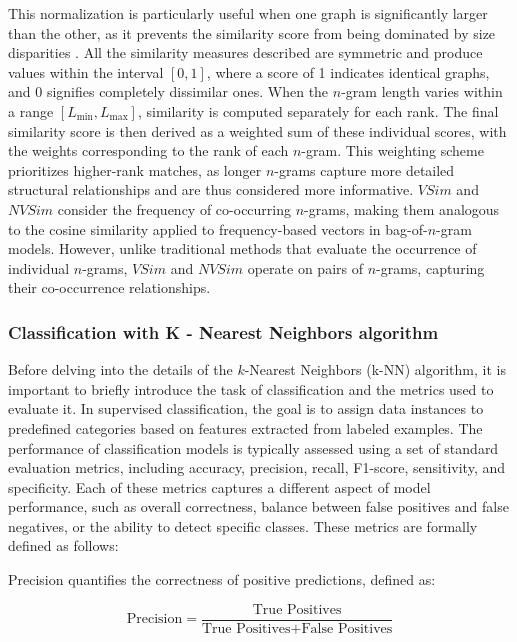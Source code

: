 \documentclass{article}
\begin{document}
This normalization is particularly useful when one graph is significantly larger than the other, as it prevents the similarity score from being dominated by size disparities \cite{giannakopoulos2008, papadakis2016}. All the similarity measures described are symmetric and produce values within the interval \([0, 1]\), where a score of 1 indicates identical graphs, and 0 signifies completely dissimilar ones. When the \( n \)-gram length varies within a range \([L_{\min}, L_{\max}]\), similarity is computed separately for each rank. The final similarity score is then derived as a weighted sum of these individual scores, with the weights corresponding to the rank of each \( n \)-gram. This weighting scheme prioritizes higher-rank matches, as longer \( n \)-grams capture more detailed structural relationships and are thus considered more informative. \( VSim \) and \( NVSim \) consider the frequency of co-occurring \( n \)-grams, making them analogous to the cosine similarity applied to frequency-based vectors in bag-of-\( n \)-gram models. However, unlike traditional methods that evaluate the occurrence of individual \( n \)-grams, \( VSim \) and \( NVSim \) operate on pairs of \( n \)-grams, capturing their co-occurrence relationships.

\subsubsection{Classification with K - Nearest Neighbors algorithm} \label{sec:classification}

Before delving into the details of the $k$-Nearest Neighbors (k-NN) algorithm, it is important to briefly introduce the task of classification and the metrics used to evaluate it. In supervised classification, the goal is to assign data instances to predefined categories based on features extracted from labeled examples. The performance of classification models is typically assessed using a set of standard evaluation metrics, including accuracy, precision, recall, F1-score, sensitivity, and specificity. Each of these metrics captures a different aspect of model performance, such as overall correctness, balance between false positives and false negatives, or the ability to detect specific classes. These metrics \cite{sokolova2009} are formally defined as follows:

Precision quantifies the correctness of positive predictions, defined as:

\[
\text{Precision} = \frac{\text{True Positives}}{\text{True Positives} + \text{False Positives}}
\]
\end{document}
